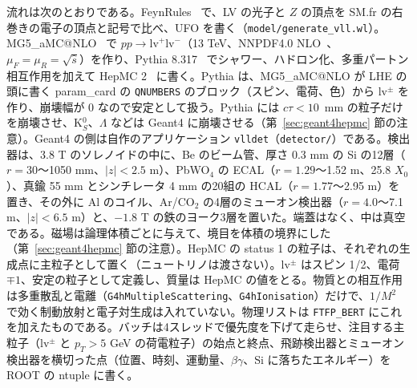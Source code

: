 \documentclass[a4paper,10pt]{ltjsarticle}
\makeatletter
\newcommand{\MGaMC}{MG5\_aMC@NLO}
\makeatother
\begin{document}
流れは次のとおりである。FeynRules~\cite{fr2} で、LV の光子と $Z$ の頂点を SM.fr の右巻きの電子の頂点と記号で比べ、UFO を書く（\texttt{model/generate\_vll.wl}）。\MGaMC{}~\cite{mg5} で $pp\to\mathrm{lv}^+\mathrm{lv}^-$（13 TeV、NNPDF4.0 NLO~\cite{nnpdf40}、$\mu_F=\mu_R=\sqrt{\hat s}$）を作り、Pythia 8.317~\cite{pythia83} でシャワー、ハドロン化、多重パートン相互作用を加えて HepMC 2~\cite{hepmc} に書く。Pythia は、\MGaMC{} が LHE の頭に書く param\_card の \texttt{QNUMBERS} のブロック（スピン、電荷、色）から lv$^\pm$ を作り、崩壊幅が 0 なので安定として扱う。Pythia には $c\tau<10$~mm の粒子だけを崩壊させ、K$^0_S$、$\Lambda$ などは Geant4 に崩壊させる（第~\ref{sec:geant4hepmc} 節の注意）。Geant4 の側は自作のアプリケーション \texttt{vlldet}（\texttt{detector/}）である。検出器は、3.8 T のソレノイドの中に、Be のビーム管、厚さ 0.3 mm の Si の12層（$r=30$〜1050 mm、$|z|<2.5$ m）、PbWO$_4$ の ECAL（$r=1.29$〜1.52 m、25.8 $X_0$）、真鍮 55 mm とシンチレータ 4 mm の20組の HCAL（$r=1.77$〜2.95 m）を置き、その外に Al のコイル、Ar/CO$_2$ の4層のミューオン検出器（$r=4.0$〜7.1 m、$|z|<6.5$ m）と、$-1.8$ T の鉄のヨーク3層を置いた。端蓋はなく、中は真空である。磁場は論理体積ごとに与えて、境目を体積の境界にした（第~\ref{sec:geant4hepmc} 節の注意）。HepMC の status 1 の粒子は、それぞれの生成点に主粒子として置く（ニュートリノは渡さない）。lv$^\pm$ はスピン 1/2、電荷 $\mp1$、安定の粒子として定義し、質量は HepMC の値をとる。物質との相互作用は多重散乱と電離（\texttt{G4hMultipleScattering}、\texttt{G4hIonisation}）だけで、$1/M^2$ で効く制動放射と電子対生成は入れていない。物理リストは \texttt{FTFP\_BERT} にこれを加えたものである。バッチは4スレッドで優先度を下げて走らせ、注目する主粒子（lv$^\pm$ と $p_T>5$ GeV の荷電粒子）の始点と終点、飛跡検出器とミューオン検出器を横切った点（位置、時刻、運動量、$\beta\gamma$、Si に落ちたエネルギー）を ROOT の ntuple に書く。
\end{document}
